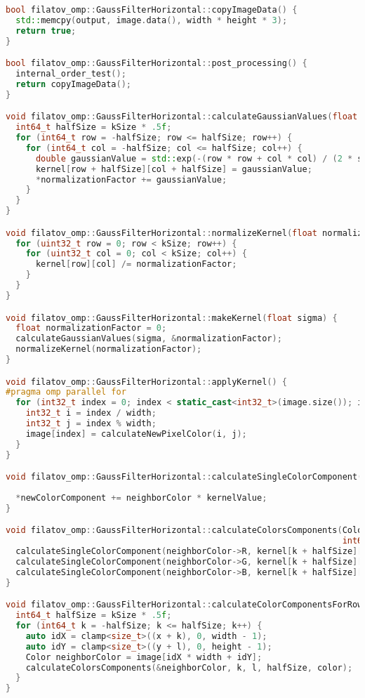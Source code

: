 \documentclass{report}
\begin{document}
\begin{lstlisting}[language=C++,caption=OpenMP версия]
bool filatov_omp::GaussFilterHorizontal::copyImageData() {
  std::memcpy(output, image.data(), width * height * 3);
  return true;
}

bool filatov_omp::GaussFilterHorizontal::post_processing() {
  internal_order_test();
  return copyImageData();
}

void filatov_omp::GaussFilterHorizontal::calculateGaussianValues(float sigma, float* normalizationFactor) {
  int64_t halfSize = kSize * .5f;
  for (int64_t row = -halfSize; row <= halfSize; row++) {
    for (int64_t col = -halfSize; col <= halfSize; col++) {
      double gaussianValue = std::exp(-(row * row + col * col) / (2 * sigma * sigma));
      kernel[row + halfSize][col + halfSize] = gaussianValue;
      *normalizationFactor += gaussianValue;
    }
  }
}

void filatov_omp::GaussFilterHorizontal::normalizeKernel(float normalizationFactor) {
  for (uint32_t row = 0; row < kSize; row++) {
    for (uint32_t col = 0; col < kSize; col++) {
      kernel[row][col] /= normalizationFactor;
    }
  }
}

void filatov_omp::GaussFilterHorizontal::makeKernel(float sigma) {
  float normalizationFactor = 0;
  calculateGaussianValues(sigma, &normalizationFactor);
  normalizeKernel(normalizationFactor);
}

void filatov_omp::GaussFilterHorizontal::applyKernel() {
#pragma omp parallel for
  for (int32_t index = 0; index < static_cast<int32_t>(image.size()); index++) {
    int32_t i = index / width;
    int32_t j = index % width;
    image[index] = calculateNewPixelColor(i, j);
  }
}

void filatov_omp::GaussFilterHorizontal::calculateSingleColorComponent(uint8_t neighborColor, float kernelValue,
                                                                       float* newColorComponent) {
  *newColorComponent += neighborColor * kernelValue;
}

void filatov_omp::GaussFilterHorizontal::calculateColorsComponents(Color* neighborColor, int64_t k, int64_t l,
                                                                   int64_t halfSize, ColorF* color) {
  calculateSingleColorComponent(neighborColor->R, kernel[k + halfSize][l + halfSize], &color->R);
  calculateSingleColorComponent(neighborColor->G, kernel[k + halfSize][l + halfSize], &color->G);
  calculateSingleColorComponent(neighborColor->B, kernel[k + halfSize][l + halfSize], &color->B);
}

void filatov_omp::GaussFilterHorizontal::calculateColorComponentsForRow(int64_t l, size_t x, size_t y, ColorF* color) {
  int64_t halfSize = kSize * .5f;
  for (int64_t k = -halfSize; k <= halfSize; k++) {
    auto idX = clamp<size_t>((x + k), 0, width - 1);
    auto idY = clamp<size_t>((y + l), 0, height - 1);
    Color neighborColor = image[idX * width + idY];
    calculateColorsComponents(&neighborColor, k, l, halfSize, color);
  }
}


\end{lstlisting}
\end{document}
